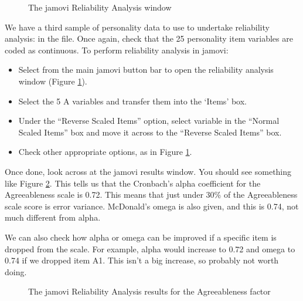 
\begin{figure}[!htp]
\begin{center}
\caption{The jamovi Reliability Analysis window}
\label{fig:rel1}
\HR
\end{center}
\end{figure}

We have a third sample of personality data to use to undertake reliability analysis: in the  file. Once again, check that the 25 personality item variables are coded as continuous. To perform reliability analysis in jamovi:

\begin{itemize} \itemsep -2pt
\item Select  from the main jamovi button bar to open the reliability analysis window (Figure \ref{fig:rel1}).
\item Select the 5 A variables and transfer them into the ‘Items’ box.
\item Under the “Reverse Scaled Items” option, select variable  in the “Normal Scaled Items” box and move it across to the “Reverse Scaled Items” box. 
\item Check other appropriate options, as in Figure \ref{fig:rel1}.
\end{itemize}


Once done, look across at the jamovi results window. You should see something like Figure \ref{fig:rel2}. This tells us that the Cronbach’s alpha coefficient for the Agreeableness scale is 0.72. This means that just under 30\% of the Agreeableness scale score is error variance. McDonald’s omega is also given, and this is 0.74, not much different from alpha.

We can also check how alpha or omega can be improved if a specific item is dropped from the scale. For example, alpha would increase to 0.72 and omega to 0.74 if we dropped item A1. This isn’t a big increase, so probably not worth doing. 

\begin{figure}[!htp]
\begin{center}
\caption{The jamovi Reliability Analysis results for the Agreeableness factor}
\label{fig:rel2}
\HR
\end{center}
\end{figure}

